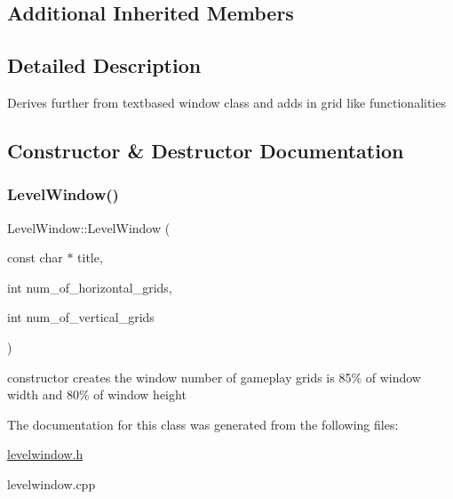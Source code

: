 \subsection*{Additional Inherited Members}


\subsection{Detailed Description}
Derives further from textbased window class and adds in grid like functionalities 

\subsection{Constructor \& Destructor Documentation}
\hypertarget{class_level_window_a2a9cf49d7e82deb24c7f80eb6cae11a8}{}\label{class_level_window_a2a9cf49d7e82deb24c7f80eb6cae11a8} 
\subsubsection{\texorpdfstring{Level\+Window()}{LevelWindow()}}
{\footnotesize\ttfamily Level\+Window\+::\+Level\+Window (\begin{DoxyParamCaption}\item[{const char $\ast$}]{title,  }\item[{int}]{num\+\_\+of\+\_\+horizontal\+\_\+grids,  }\item[{int}]{num\+\_\+of\+\_\+vertical\+\_\+grids }\end{DoxyParamCaption})}

constructor creates the window number of gameplay grids is 85\% of window width and 80\% of window height 

The documentation for this class was generated from the following files\+:\begin{DoxyCompactItemize}
\item 
\hyperlink{levelwindow_8h}{levelwindow.\+h}\item 
levelwindow.\+cpp\end{DoxyCompactItemize}
